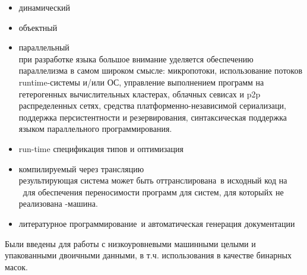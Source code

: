 \secdown


\begin{itemize}

\item динамический

\item объектный

\item параллельный
\\ при разработке языка большое внимание уделяется обеспечению параллелизма в 
самом широком смысле: микропотоки, использование потоков runtime-системы и/или
ОС, управление выполнением программ на гетерогенных вычислительных кластерах, 
облачных севисах и p2p распределенных сетях, средства платформенно-независимой
сериализаци, поддержка персистентности и резервирования, синтаксическая 
поддержка языком параллельного программирования. 

\item run-time спецификация типов и оптимизация

\item компилируемый через трансляцию
\\ результирующая система может быть оттранслирована\ в 
исходный код на \cpp\ для обеспечения переносимости программ для систем, для
которыйх не реализована \bi-машина.

\item литературное программирование\ и 
автоматическая генерация документации  

\end{itemize}



\secdown

\secdown
{}

Были введены для работы с низкоуровневыми машинными целыми и упакованными
двоичными данными, в т.ч. использования в качестве бинарных масок. 

\secup

\secdown
{}

\secup

